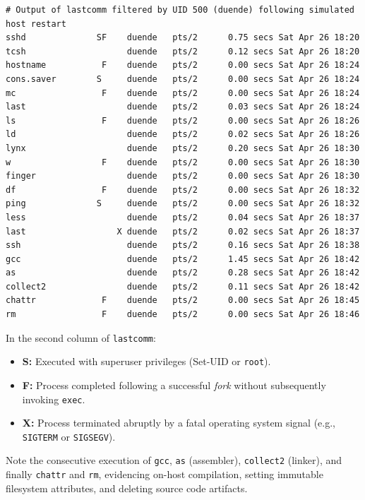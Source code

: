\begin{lstlisting}[style=terminal]
# Output of lastcomm filtered by UID 500 (duende) following simulated host restart
sshd              SF    duende   pts/2      0.75 secs Sat Apr 26 18:20
tcsh                    duende   pts/2      0.12 secs Sat Apr 26 18:20
hostname           F    duende   pts/2      0.00 secs Sat Apr 26 18:24
cons.saver        S     duende   pts/2      0.00 secs Sat Apr 26 18:24
mc                 F    duende   pts/2      0.00 secs Sat Apr 26 18:24
last                    duende   pts/2      0.03 secs Sat Apr 26 18:24
ls                 F    duende   pts/2      0.00 secs Sat Apr 26 18:26
ld                      duende   pts/2      0.02 secs Sat Apr 26 18:26
lynx                    duende   pts/2      0.20 secs Sat Apr 26 18:30
w                  F    duende   pts/2      0.00 secs Sat Apr 26 18:30
finger                  duende   pts/2      0.00 secs Sat Apr 26 18:30
df                 F    duende   pts/2      0.00 secs Sat Apr 26 18:32
ping              S     duende   pts/2      0.00 secs Sat Apr 26 18:32
less                    duende   pts/2      0.04 secs Sat Apr 26 18:37
last                  X duende   pts/2      0.02 secs Sat Apr 26 18:37
ssh                     duende   pts/2      0.16 secs Sat Apr 26 18:38
gcc                     duende   pts/2      1.45 secs Sat Apr 26 18:42
as                      duende   pts/2      0.28 secs Sat Apr 26 18:42
collect2                duende   pts/2      0.11 secs Sat Apr 26 18:42
chattr             F    duende   pts/2      0.00 secs Sat Apr 26 18:45
rm                 F    duende   pts/2      0.00 secs Sat Apr 26 18:46
\end{lstlisting}

\begin{notaforense}
In the second column of \texttt{lastcomm}:
\begin{itemize}
    \item \textbf{S:} Executed with superuser privileges (Set-UID or \texttt{root}).
    \item \textbf{F:} Process completed following a successful \textit{fork} without subsequently invoking \texttt{exec}.
    \item \textbf{X:} Process terminated abruptly by a fatal operating system signal (e.g., \texttt{SIGTERM} or \texttt{SIGSEGV}).
\end{itemize}
Note the consecutive execution of \texttt{gcc}, \texttt{as} (assembler), \texttt{collect2} (linker), and finally \texttt{chattr} and \texttt{rm}, evidencing on-host compilation, setting immutable filesystem attributes, and deleting source code artifacts.
\end{notaforense}

